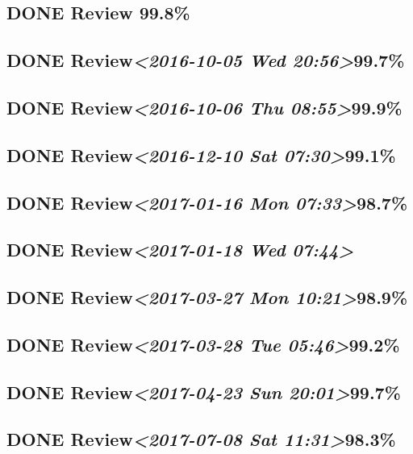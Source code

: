 \documentclass[11pt]{ctexart}
\begin{document}
\subsection{{\bfseries\sffamily DONE} Review 99.8\%}
\label{sec:orgc14f267}
\subsection{{\bfseries\sffamily DONE} Review\textit{<2016-10-05 Wed 20:56>}99.7\%}
\label{sec:orgb04727f}
\subsection{{\bfseries\sffamily DONE} Review\textit{<2016-10-06 Thu 08:55>}99.9\%}
\label{sec:org41ad7e0}
\subsection{{\bfseries\sffamily DONE} Review\textit{<2016-12-10 Sat 07:30>}99.1\%}
\label{sec:orge25568f}
\subsection{{\bfseries\sffamily DONE} Review\textit{<2017-01-16 Mon 07:33>}98.7\%}
\label{sec:org66e2645}
\subsection{{\bfseries\sffamily DONE} Review\textit{<2017-01-18 Wed 07:44>}}
\label{sec:org600d2e0}
\subsection{{\bfseries\sffamily DONE} Review\textit{<2017-03-27 Mon 10:21>}98.9\%}
\label{sec:org500686b}
\subsection{{\bfseries\sffamily DONE} Review\textit{<2017-03-28 Tue 05:46>}99.2\%}
\label{sec:orgc51ff05}
\subsection{{\bfseries\sffamily DONE} Review\textit{<2017-04-23 Sun 20:01>}99.7\%}
\label{sec:org313a807}
\subsection{{\bfseries\sffamily DONE} Review\textit{<2017-07-08 Sat 11:31>}98.3\%}
\label{sec:org9e98079}
\end{document}
